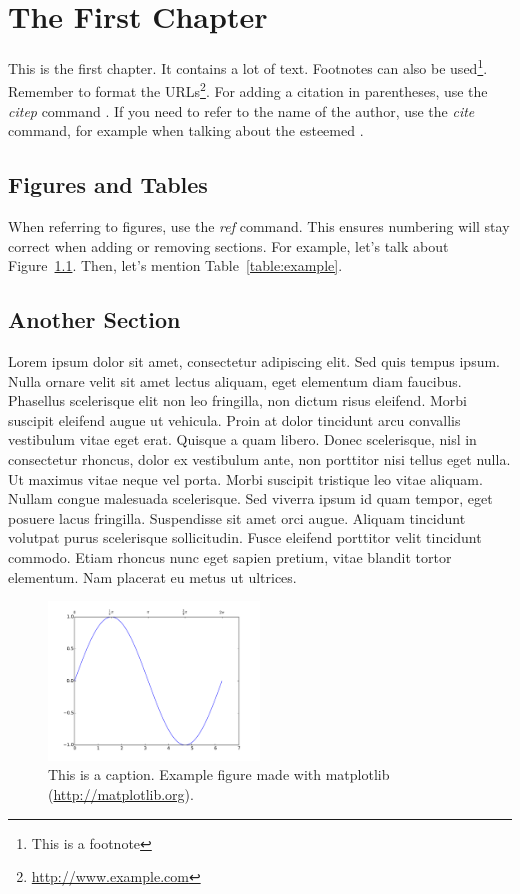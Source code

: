 \chapter{The First Chapter}

This is the first chapter. It contains a lot of text. Footnotes can also be
used\footnote{This is a footnote}. Remember to format the
URLs\footnote{\url{http://www.example.com}}. For adding a citation in
parentheses, use the \emph{citep} command \citep{dummy1}. If you need to refer
to the name of the author, use the \emph{cite} command, for example when talking
about the esteemed \cite{dummy2}.

\section{Figures and Tables}

When referring to figures, use the \emph{ref} command. This ensures numbering
will stay correct when adding or removing sections. For example, let's talk
about Figure~\ref{figure:example}. Then, let's mention
Table~\ref{table:example}.

\section{Another Section}

Lorem ipsum dolor sit amet, consectetur adipiscing elit. Sed quis tempus ipsum.
Nulla ornare velit sit amet lectus aliquam, eget elementum diam faucibus.
Phasellus scelerisque elit non leo fringilla, non dictum risus eleifend. Morbi
suscipit eleifend augue ut vehicula. Proin at dolor tincidunt arcu convallis
vestibulum vitae eget erat. Quisque a quam libero. Donec scelerisque, nisl in
consectetur rhoncus, dolor ex vestibulum ante, non porttitor nisi tellus eget
nulla. Ut maximus vitae neque vel porta. Morbi suscipit tristique leo vitae
aliquam. Nullam congue malesuada scelerisque. Sed viverra ipsum id quam tempor,
eget posuere lacus fringilla. Suspendisse sit amet orci augue. Aliquam tincidunt
volutpat purus scelerisque sollicitudin. Fusce eleifend porttitor velit
tincidunt commodo. Etiam rhoncus nunc eget sapien pretium, vitae blandit tortor
elementum. Nam placerat eu metus ut ultrices.

\begin{figure}[!tpb]
\centerline{\includegraphics[width=0.5\textwidth]{figures/example.pdf}}
\caption{This is a caption. Example figure made with matplotlib
(\url{http://matplotlib.org}).}
\label{figure:example}
\end{figure}

